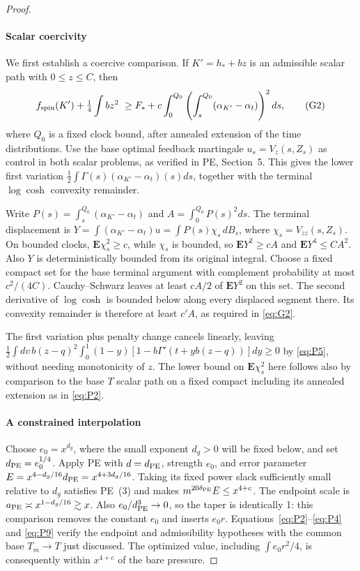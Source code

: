 \begin{proof}
\paragraph{Scalar coercivity}
We first establish a coercive comparison. If \(K'=h_*+b z\) is an admissible scalar path with \(0\le z\le C\), then
\[
 f_{\rm spin}(K')+\tfrac14\int b z^2
 \ \ge F_*+c\int_0^{Q_0}\left(\int_s^{Q_0}(\alpha_{K'}-\alpha_t)\right)^2 ds ,
                                                                     \tag{G2}\label{eq:G2}
\]
where \(Q_0\) is a fixed clock bound, after annealed extension of
the time distributions. Use the base optimal feedback martingale
\(u_s=V_z(s,Z_s)\) as control in both scalar problems, as verified
in PE, Section~5. This gives the lower first variation
\(\frac12\int\Gamma(s)(\alpha_{K'}-\alpha_t)(s)ds\), together
with the terminal \(\log\cosh\) convexity remainder.

Write \(P(s)=\int_s^{Q_0}(\alpha_{K'}-\alpha_t)\) and
\(A=\int_0^{Q_0}P(s)^2ds\). The terminal displacement is
\(Y=\int(\alpha_{K'}-\alpha_t)u=\int P(s)\chi_s\,dB_s\),
where \(\chi_s=V_{zz}(s,Z_s)\). On bounded clocks,
\(\mathbf E\chi_s^2\ge c\), while \(\chi_s\) is bounded, so
\(\mathbf EY^2\ge cA\) and \(\mathbf EY^4\le CA^2\).
Also \(Y\) is deterministically bounded from its original integral.
Choose a fixed compact set for the base terminal argument with
complement probability at most \(c^2/(4C)\). Cauchy--Schwarz leaves
at least \(cA/2\) of \(\mathbf EY^2\) on this set. The second
derivative of \(\log\cosh\) is bounded below along every displaced
segment there. Its convexity remainder is therefore at least \(c'A\),
as required in \eqref{eq:G2}.

The first variation plus penalty change cancels linearly, leaving
\(\tfrac12\int dv\, b(z-q)^2\int_0^1(1-y)[1-b\Gamma'(t+y b(z-q))]dy\ge0\) by \eqref{eq:P5}, without needing monotonicity of \(z\). The lower bound on \(\mathbf E\chi_s^2\) here follows also by comparison to the base \(T\) scalar path on a fixed compact including its annealed extension as in \eqref{eq:P2}.

\paragraph{A constrained interpolation}
Choose \(e_0=x^{d_g}\), where the small exponent \(d_g>0\) will
be fixed below, and set \(d_{\rm PE}=e_0^{1/4}\). Apply PE with
\(d=d_{\rm PE}\), strength \(e_0\), and error parameter
\(E=x^{4-d_g/16}d_{\rm PE}=x^{4+3d_g/16}\). Taking its fixed
power slack sufficiently small relative to \(d_g\) satisfies
PE~(3) and makes \(m^{20\delta_{\rm PE}}E\le x^{4+c}\).
The endpoint scale is \(a_{\rm PE}\asymp x^{1-d_g/16}\gtrsim x\).
Also \(e_0/d_{\rm PE}^3\to0\), so the taper is identically 1:
this comparison removes the constant \(e_0\) and inserts \(e_0r\).
Equations~\eqref{eq:P2}--\eqref{eq:P4} and \eqref{eq:P9} verify
the endpoint and admissibility hypotheses with the common base
\(T_m\to T\) just discussed. The optimized value, including
\(\int e_0r^2/4\), is consequently within \(x^{4+c}\) of the
bare pressure.


\end{proof}
